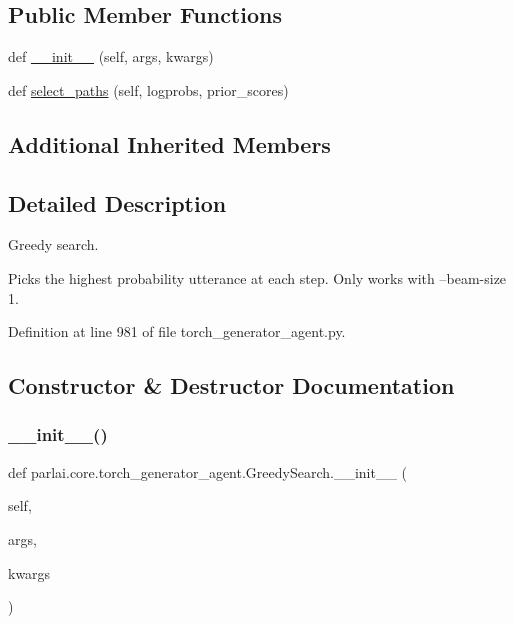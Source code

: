 \subsection*{Public Member Functions}
\begin{DoxyCompactItemize}
\item 
def \hyperlink{classparlai_1_1core_1_1torch__generator__agent_1_1GreedySearch_a3d82930c25aa494772148c51f67d5f0d}{\+\_\+\+\_\+init\+\_\+\+\_\+} (self, args, kwargs)
\item 
def \hyperlink{classparlai_1_1core_1_1torch__generator__agent_1_1GreedySearch_aa201e7824f50e2830cede9adc4bffcd6}{select\+\_\+paths} (self, logprobs, prior\+\_\+scores)
\end{DoxyCompactItemize}
\subsection*{Additional Inherited Members}


\subsection{Detailed Description}
\begin{DoxyVerb}Greedy search.

Picks the highest probability utterance at each step.  Only works with
--beam-size 1.
\end{DoxyVerb}
 

Definition at line 981 of file torch\+\_\+generator\+\_\+agent.\+py.



\subsection{Constructor \& Destructor Documentation}
\mbox{\label{classparlai_1_1core_1_1torch__generator__agent_1_1GreedySearch_a3d82930c25aa494772148c51f67d5f0d}} 
\subsubsection{\texorpdfstring{\+\_\+\+\_\+init\+\_\+\+\_\+()}{\_\_init\_\_()}}
{\footnotesize\ttfamily def parlai.\+core.\+torch\+\_\+generator\+\_\+agent.\+Greedy\+Search.\+\_\+\+\_\+init\+\_\+\+\_\+ (\begin{DoxyParamCaption}\item[{}]{self,  }\item[{}]{args,  }\item[{}]{kwargs }\end{DoxyParamCaption})}



